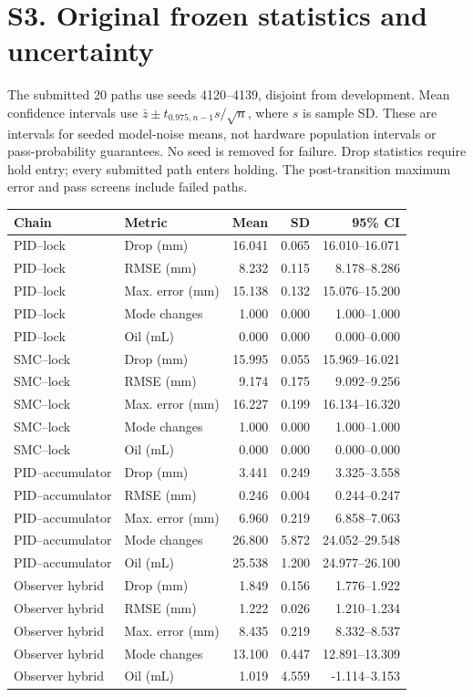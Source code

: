 \documentclass[11pt,a4paper]{article}
\begin{document}
\section*{S3. Original frozen statistics and uncertainty}
The submitted 20 paths use seeds 4120--4139, disjoint from development. Mean confidence intervals use $\bar z\pm t_{0.975,n-1}s/\sqrt n$, where $s$ is sample SD. These are intervals for seeded model-noise means, not hardware population intervals or pass-probability guarantees. No seed is removed for failure. Drop statistics require hold entry; every submitted path enters holding. The post-transition maximum error and pass screens include failed paths.
\begin{longtable}{p{.23\linewidth}p{.26\linewidth}rrr}\toprule Chain & Metric & Mean & SD & 95\% CI\\\midrule\endhead
PID--lock & Drop (mm) & 16.041 & 0.065 & 16.010--16.071 \\
PID--lock & RMSE (mm) & 8.232 & 0.115 & 8.178--8.286 \\
PID--lock & Max. error (mm) & 15.138 & 0.132 & 15.076--15.200 \\
PID--lock & Mode changes & 1.000 & 0.000 & 1.000--1.000 \\
PID--lock & Oil (mL) & 0.000 & 0.000 & 0.000--0.000 \\
SMC--lock & Drop (mm) & 15.995 & 0.055 & 15.969--16.021 \\
SMC--lock & RMSE (mm) & 9.174 & 0.175 & 9.092--9.256 \\
SMC--lock & Max. error (mm) & 16.227 & 0.199 & 16.134--16.320 \\
SMC--lock & Mode changes & 1.000 & 0.000 & 1.000--1.000 \\
SMC--lock & Oil (mL) & 0.000 & 0.000 & 0.000--0.000 \\
PID--accumulator & Drop (mm) & 3.441 & 0.249 & 3.325--3.558 \\
PID--accumulator & RMSE (mm) & 0.246 & 0.004 & 0.244--0.247 \\
PID--accumulator & Max. error (mm) & 6.960 & 0.219 & 6.858--7.063 \\
PID--accumulator & Mode changes & 26.800 & 5.872 & 24.052--29.548 \\
PID--accumulator & Oil (mL) & 25.538 & 1.200 & 24.977--26.100 \\
Observer hybrid & Drop (mm) & 1.849 & 0.156 & 1.776--1.922 \\
Observer hybrid & RMSE (mm) & 1.222 & 0.026 & 1.210--1.234 \\
Observer hybrid & Max. error (mm) & 8.435 & 0.219 & 8.332--8.537 \\
Observer hybrid & Mode changes & 13.100 & 0.447 & 12.891--13.309 \\
Observer hybrid & Oil (mL) & 1.019 & 4.559 & -1.114--3.153 \\
\bottomrule\end{longtable}
\end{document}
